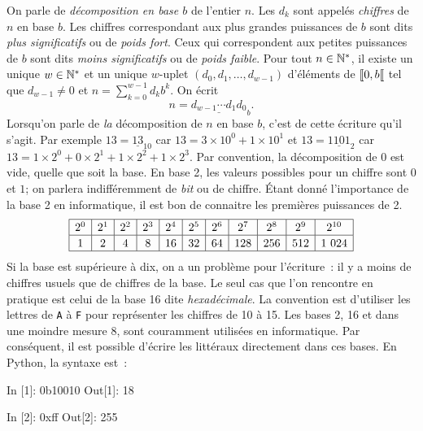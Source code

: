 \documentclass{magnolia}
\begin{document}
\begin{remarques}
\remarque On parle de \emph{décomposition en base $b$} de l'entier $n$. Les $d_k$ sont appelés
  \emph{chiffres} de $n$ en base $b$.
\remarque Les chiffres correspondant aux plus grandes puissances de $b$ sont dits
    \emph{plus significatifs} ou de \emph{poids fort}. Ceux qui correspondent aux
    petites puissances de $b$ sont dits \emph{moins significatifs} ou de
    \emph{poids faible}.
\remarque Pour tout $n\in{\mathbb{N}^*}$, il existe un unique $w\in{\mathbb{N}^*}$ et un unique
  $w$-uplet $(d_0,d_1,\ldots,d_{w-1})$ d'éléments de $\left\llbracket 0,b\right\llbracket$ tel que
  $d_{w-1}\neq 0$ et $n=\sum_{k=0}^{w-1} d_k b^k$. On écrit
  \[n=\underline{d_{w-1}\cdots d_1 d_0}_{b}.\]
  Lorsqu'on parle de \emph{la} décomposition de $n$ en base $b$, c'est de cette écriture
  qu'il s'agit. 
  Par exemple $13=\underline{13}_{10}$ car $13=3\times 10^0 + 1\times 10^1$ et
  $13=\underline{1101}_{2}$ car $13=1\times 2^0+0\times 2^1+1\times 2^2+1\times 2^3$. Par convention, la décomposition de 0 est vide, quelle que soit la base.
\remarque En base 2, les valeurs possibles pour un chiffre sont $0$ et $1$; on
  parlera indifféremment de \emph{bit} ou de chiffre. Étant donné l'importance de la
  base 2 en informatique, il est bon de connaitre les premières puissances de 2.
  \[\begin{array}{|c|c|c|c|c|c|c|c|c|c|c|}
  \hline
  \raisebox{10pt}{} 2^0 & 2^1 & 2^2 & 2^3 & 2^4 & 2^5 & 2^6 & 2^7 & 2^8 & 2^9 & 2^{10} \\
  \hline
  \raisebox{10pt}{} 1 & 2 & 4 & 8 & 16 & 32 & 64 & 128 & 256 & 512 & 1\ 024 \\
  \hline
  \end{array}\]
\remarque Si la base est supérieure à dix, on a un problème pour l'écriture~: il y a moins
  de chiffres usuels que de chiffres de la base. Le seul cas que l'on rencontre en pratique
  est celui de la base 16 dite \emph{hexadécimale}. La convention est d'utiliser les lettres
  de \verb!A! à \verb!F! pour représenter les chiffres de 10 à 15. 
\remarque Les bases 2, 16 et dans une moindre mesure 8, sont couramment utilisées
  en informatique. Par conséquent, il est possible d'écrire les littéraux directement dans
  ces bases. En Python, la syntaxe est~:
\begin{pythoncode}
In [1]: 0b10010
Out[1]: 18

In [2]: 0xff
Out[2]: 255


\end{pythoncode}
\end{remarques}
\end{document}
